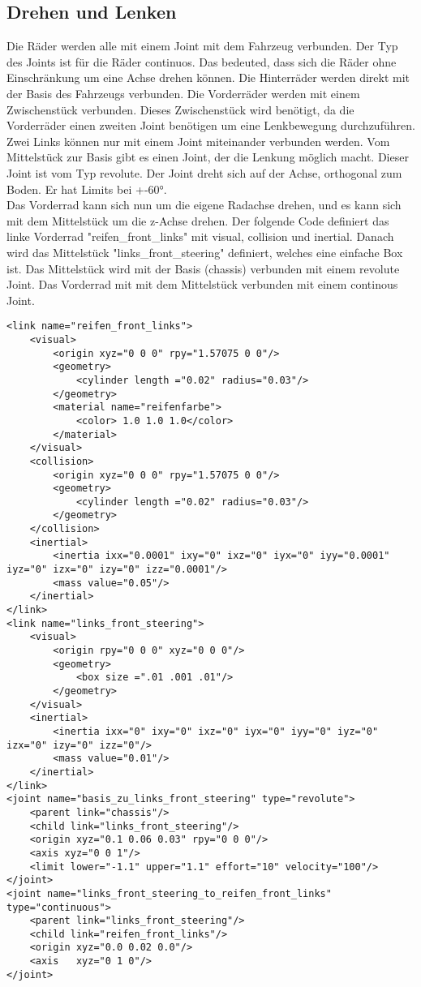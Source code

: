 \subsection*{Drehen und Lenken}
Die Räder werden alle mit einem Joint mit dem Fahrzeug verbunden.
Der Typ des Joints ist für die Räder continuos. Das bedeuted, dass sich die Räder ohne Einschränkung um eine Achse drehen können.
Die Hinterräder werden direkt mit der Basis des Fahrzeugs verbunden.
Die Vorderräder werden mit einem Zwischenstück verbunden.
Dieses Zwischenstück wird benötigt, da die Vorderräder einen zweiten Joint benötigen um eine Lenkbewegung durchzuführen.
Zwei Links können nur mit einem Joint miteinander verbunden werden.
Vom Mittelstück zur Basis gibt es einen Joint, der die Lenkung möglich macht.
Dieser Joint ist vom Typ revolute. 
Der Joint dreht sich auf der Achse, orthogonal zum Boden.
Er hat Limits bei +-60°.\\
Das Vorderrad kann sich nun um die eigene Radachse drehen, und es kann sich mit dem Mittelstück um die z-Achse drehen.
Der folgende Code definiert das linke Vorderrad "reifen\_front\_links" mit visual, collision und inertial.
Danach wird das Mittelstück "links\_front\_steering" definiert, welches eine einfache Box ist.
Das Mittelstück wird mit der Basis (chassis) verbunden mit einem revolute Joint. 
Das Vorderrad mit mit dem Mittelstück verbunden mit einem continous Joint.
\begin{lstlisting}
<link name="reifen_front_links">
    <visual>
        <origin xyz="0 0 0" rpy="1.57075 0 0"/>
        <geometry>
            <cylinder length ="0.02" radius="0.03"/>
        </geometry>
        <material name="reifenfarbe">
            <color> 1.0 1.0 1.0</color>
        </material>
    </visual>
    <collision>
        <origin xyz="0 0 0" rpy="1.57075 0 0"/>
        <geometry>
            <cylinder length ="0.02" radius="0.03"/>
        </geometry>
    </collision>
    <inertial>
        <inertia ixx="0.0001" ixy="0" ixz="0" iyx="0" iyy="0.0001" iyz="0" izx="0" izy="0" izz="0.0001"/>
        <mass value="0.05"/>
    </inertial>
</link>
<link name="links_front_steering">
    <visual>
        <origin rpy="0 0 0" xyz="0 0 0"/>
        <geometry>
            <box size =".01 .001 .01"/>
        </geometry>
    </visual>
    <inertial>
        <inertia ixx="0" ixy="0" ixz="0" iyx="0" iyy="0" iyz="0" izx="0" izy="0" izz="0"/>
        <mass value="0.01"/>
    </inertial>
</link>
<joint name="basis_zu_links_front_steering" type="revolute">
    <parent link="chassis"/>
    <child link="links_front_steering"/>
    <origin xyz="0.1 0.06 0.03" rpy="0 0 0"/>
    <axis xyz="0 0 1"/>
    <limit lower="-1.1" upper="1.1" effort="10" velocity="100"/>
</joint>
<joint name="links_front_steering_to_reifen_front_links" type="continuous">
    <parent link="links_front_steering"/>
    <child link="reifen_front_links"/>
    <origin xyz="0.0 0.02 0.0"/>
    <axis   xyz="0 1 0"/>
</joint>
\end{lstlisting}
